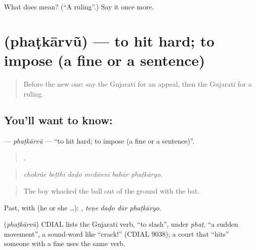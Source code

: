 \begin{tcolorbox}[breakable,colback=teal!4,colframe=teal!35!black,title={Before you move on}]
What does  mean? (\textquotedblleft{}A ruling\textquotedblright{}.) Say it once more.
\end{tcolorbox}
\section[\texorpdfstring{\gu{ફટકારવું} (phaṭkārvũ)}{ફટકારવું (phaṭkārvũ)}]{ (phaṭkārvũ) — to hit hard; to impose (a fine or a sentence)}

\label{lesson:GU-C348-phatkarvu}



\begin{quote}
Before the new one: say the Gujarati for an appeal, then the Gujarati for a ruling.
\end{quote}

\subsection*{You'll want to know: }
\textbf{} — \emph{phaṭkārvũ} — \textquotedblleft{}to hit hard; to impose (a fine or a sentence)\textquotedblright{}.

\begin{quote}
     .
\end{quote}

\begin{quote}
\emph{chokrāe beṭthī daḍo medānnī bahār phaṭkāryo.}
\end{quote}

\begin{quote}
The boy whacked the ball out of the ground with the bat.
\end{quote}

Past, with  (he or she …):    , \emph{teṇe daḍo dūr phaṭkāryo}.

\begin{cousinweb}
\textbf{} (\emph{phaṭkārvũ}) CDIAL lists the Gujarati verb, \textquotedblleft{}to slash\textquotedblright{}, under \emph{phaṭ}, \textquotedblleft{}a sudden movement\textquotedblright{}, a sound-word like \textquotedblleft{}crack!\textquotedblright{} (CDIAL 9038); a court that \textquotedblleft{}hits\textquotedblright{} someone with a fine uses the same verb.
\end{cousinweb}

